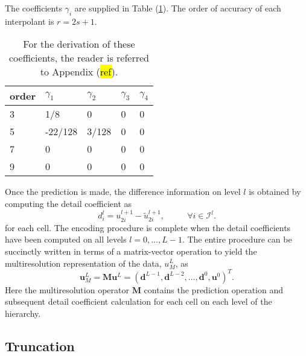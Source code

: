 \documentclass[12pt,letterpaper]{article}
\begin{document}
        The coefficients $\gamma_{i}$ are supplied in Table
        (\ref{coeff1}). The order of accuracy of each interpolant is $r=2s+1$.
        \begin{table}[]
            \center
            \begin{tabular}{|l|l|l|l|l|}
            \hline
                order    & $\gamma_{1}$ & $\gamma_{2}$ & $\gamma_{3}$ & $\gamma_{4}$ \\ \hline
                3 & 1/8          & 0            & 0            & 0            \\ \hline
                5 & -22/128      & 3/128        & 0            & 0            \\ \hline
                7 & 0            & 0            & 0            & 0            \\ \hline
                9 & 0            & 0            & 0            & 0            \\ \hline
            \end{tabular}
            \label{coeff1}
            \caption{For the derivation of these coefficients, the reader is referred to Appendix (\hl{ref}).}
        \end{table}
        Once the prediction is made, the difference information on level $l$ is
        obtained by computing the detail coefficient as
        \begin{equation}
            d^{l}_{i} = u^{l+1}_{2i} - \tilde{u}^{l+1}_{2i}, \text{ } \text{ }
            \text{ } \text{ } \forall i \in \bm{\mathcal{I}}^{l}.
        \end{equation}
        for each cell.  The encoding procedure is complete when the detail
        coefficients have been computed on all levels $l=0,\dots,L-1$.  The
        entire procedure can be succinctly written in terms of a matrix-vector
        operation to yield the multiresolution representation of the data,
        $u_{M}^{L}$, as
        \begin{equation}
            \bm{u}^{L}_{M} = \bm{M} \bm{u}^{L} = \left( \bm{d}^{L-1}, \bm{d}^{L-2},
            \dots, \bm{d}^{0}, \bm{u}^{0} \right)^{T}.
        \end{equation}
        Here the multiresolution operator $\bm{M}$ contains the prediction
        operation and subsequent detail coefficient calculation for each cell
        on each level of the hierarchy.

    \subsection*{Truncation}
\end{document}
